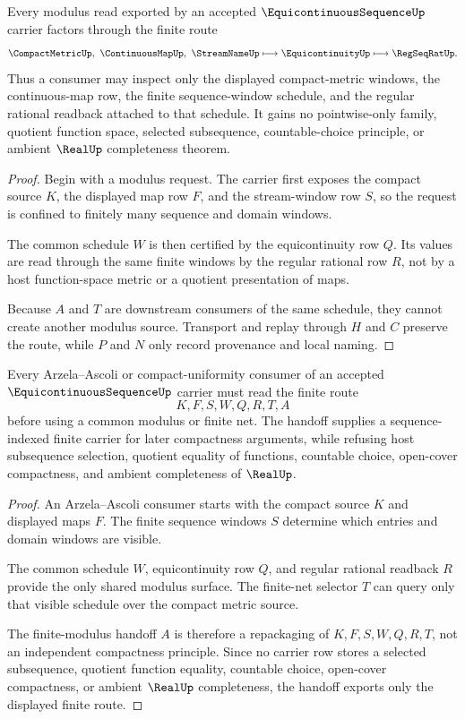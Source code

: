 \begin{theorem}
\label{thm:equicontinuous-sequence-finite-window-modulus}
Every modulus read exported by an accepted $\EquicontinuousSequenceUp$ carrier factors through the finite route
$$
\CompactMetricUp,\ \ContinuousMapUp,\ \StreamNameUp
\longmapsto
\EquicontinuityUp
\longmapsto
\RegSeqRatUp .
$$
Thus a consumer may inspect only the displayed compact-metric windows, the continuous-map row, the finite sequence-window schedule, and the regular rational readback attached to that schedule. It gains no pointwise-only family, quotient function space, selected subsequence, countable-choice principle, or ambient $\RealUp$ completeness theorem.
\end{theorem}
\begin{proof}
Begin with a modulus request. The carrier first exposes the compact source $K$, the displayed map row $F$, and the stream-window row $S$, so the request is confined to finitely many sequence and domain windows.

The common schedule $W$ is then certified by the equicontinuity row $Q$. Its values are read through the same finite windows by the regular rational row $R$, not by a host function-space metric or a quotient presentation of maps.

Because $A$ and $T$ are downstream consumers of the same schedule, they cannot create another modulus source. Transport and replay through $H$ and $C$ preserve the route, while $P$ and $N$ only record provenance and local naming.
\end{proof}

\begin{theorem}
\label{thm:equicontinuous-sequence-arzela-ascoli-handoff}
Every Arzela--Ascoli or compact-uniformity consumer of an accepted $\EquicontinuousSequenceUp$ carrier must read the finite route
$$
K,F,S,W,Q,R,T,A
$$
before using a common modulus or finite net. The handoff supplies a sequence-indexed finite carrier for later compactness arguments, while refusing host subsequence selection, quotient equality of functions, countable choice, open-cover compactness, and ambient completeness of $\RealUp$.
\end{theorem}
\begin{proof}
An Arzela--Ascoli consumer starts with the compact source $K$ and displayed maps $F$. The finite sequence windows $S$ determine which entries and domain windows are visible.

The common schedule $W$, equicontinuity row $Q$, and regular rational readback $R$ provide the only shared modulus surface. The finite-net selector $T$ can query only that visible schedule over the compact metric source.

The finite-modulus handoff $A$ is therefore a repackaging of $K,F,S,W,Q,R,T$, not an independent compactness principle. Since no carrier row stores a selected subsequence, quotient function equality, countable choice, open-cover compactness, or ambient $\RealUp$ completeness, the handoff exports only the displayed finite route.
\end{proof}

